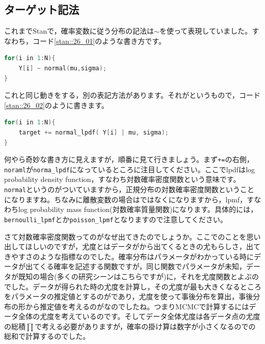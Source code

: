 \documentclass{ltjsbook}
\begin{document}
\subsection{ターゲット記法}
これまでStanで，確率変数に従う分布の記法は$\sim$を使って表現していました。すなわち，コード\ref{stan::26_01}のような書き方です。
\begin{lstlisting}[language=C++,label={stan::26_01},caption={sampling記法}]
for(i in 1:N){
    Y[i] ~ normal(mu,sigma);
}
\end{lstlisting}
これと同じ動きをする，別の表記方法があります。それがというもので，コード\ref{stan::26_02}のように書きます。
\begin{lstlisting}[language=C++,label={stan::26_02},caption={target記法}]
for(i in 1:N){
    target += normal_lpdf( Y[i] | mu, sigma);
}
\end{lstlisting}

何やら奇妙な書き方に見えますが，順番に見て行きましょう。まず\verb|+=|の右側，\verb|noraml|が\verb|norma_lpdf|になっているところに注目してください。ここでlpdfはlog probability density function，すなわち対数確率密度関数という意味です。\verb|normal|というのがついていますから，正規分布の対数確率密度関数ということになりますね。ちなみに離散変数の場合はではなくになりますから，lpmf，すなわちlog probability mass function(対数確率質量関数)になります。具体的には，\verb|bernoulli_lpmf|とか\verb|poisson_lpmf|となりますので注意してください。

さて対数確率密度関数ってのがなぜ出てきたのでしょうか。ここでのことを思い出してほしいのですが，尤度とはデータがから出てくるときの尤もらしさ，出てきやすさのような指標なのでした。確率分布はパラメータがわかっている時にデータが出てくる確率を記述する関数ですが，同じ関数でパラメータが未知，データが既知の場合(多くの研究シーンはこちらですが)に，それを尤度関数とよぶのでした。データが得られた時の尤度を計算し，その尤度が最も大きくなるところをパラメータの推定値とするのがであり，尤度を使って事後分布を算出，事後分布の形から推定値を考えるのがなのでしたね。つまりMCMCで計算するにはデータ全体の尤度を考えているのです。そしてデータ全体尤度は各データ点の尤度の総積$\prod$で考える必要がありますが，確率の掛け算は数字が小さくなるのでの総和で計算するのでした。
\end{document}
